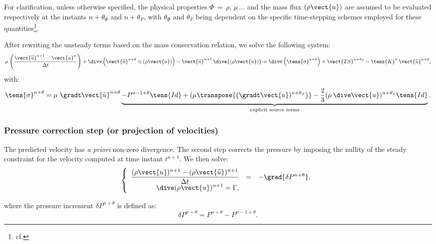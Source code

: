 For clarification, unless otherwise specified, the physical properties
$\Phi\,=\,\rho,\,\mu\,...$ and the mass flux $(\rho\vect{u})$ are assumed
to be evaluated respectively at the instants $n+\theta_\Phi$ and
$n+\theta_F$, with $\theta_\Phi$ and $\theta_F$ being dependent on the
specific time-stepping schemes employed for these
quantities\footnote{cf. }.

After rewriting the unsteady terms based on the mass conservation relation,
we solve the following system:
\begin{equation}
\displaystyle
\rho\,\left(\dfrac{\vect{\widetilde{u}}^{n+1}-\vect {u}^{n}}{\Delta t}\right) +
\divv \left(\vect{\widetilde{u}}^{n+\theta} \otimes (\rho\vect{u}) \right)
-\vect{\widetilde{u}}^{n+1}\,\dive{(\rho\vect{u})}
  =
  \divv \left(\tens{\sigma}^{n+\theta}\right) + \vect{TS}^{n+\theta_{S}}-\tens{K}^{n}\,\vect{\widetilde{u}}^{n+\theta} ,
\label{eq:navstv:c0_prediction_step}
\end{equation}
with:
\begin{equation}
\displaystyle
\tens{\sigma}^{n+\theta}=\mu\,\,\gradt\vect{\widetilde{u}}^{n+\theta}\underbrace{-P^{n-1+\theta}\tens{Id}+ (\mu \transpose{ \left(\gradt\vect{u})^{n+\theta_{S}}\right)}- \frac{2}{3} ( \mu\, \dive \vect{u})^{n+\theta_{S}}\tens{Id}}_{\text{explicit source terms}}.
\end{equation}

\subsubsection*{Pressure correction step (or projection of velocities)}
The predicted velocity has \emph{a priori} non-zero divergence. The second step
corrects the pressure by imposing the nullity of the steady constraint for
the velocity computed at time instant ${t^{n+1}}$.
We then solve:
\begin{equation}\label{eq:navstv:c0_correction_step}
\left\{\begin{array}{ r c l}
\displaystyle \dfrac{(\rho\vect{u})^{n+1}-(\rho\vect{\widetilde{u}})^{n+1}}{\Delta t} &=&
-\grad{\delta P^{n+\theta}} ,\\
\displaystyle
\dive(\rho\vect{u})^{n+1} = \Gamma ,\\
\end{array}\right.
\end{equation}

where the pressure increment $\delta P^{n+\theta}$ is defined as:
\begin{equation}
\delta P^{n+\theta}=P^{n+\theta}-P^{n-1+\theta} .
\end{equation}

